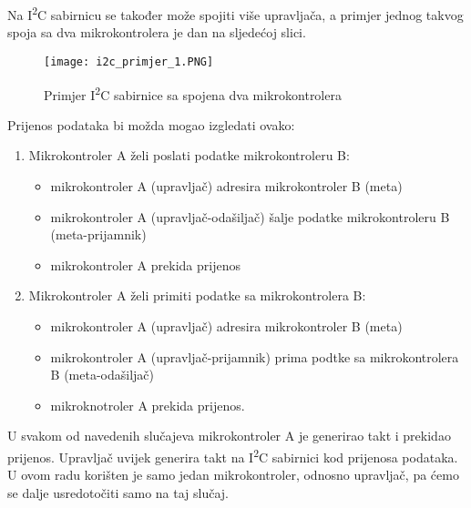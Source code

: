 Na I\textsuperscript{2}C sabirnicu se također može spojiti više upravljača, a
primjer jednog takvog spoja sa dva mikrokontrolera je dan na sljedećoj slici.
\begin{figure}[hp]
	\centering
	\texttt{[image: i2c\_primjer\_1.PNG]}
	\caption{Primjer I\textsuperscript{2}C sabirnice sa spojena dva
	mikrokontrolera}
	\label{fig:i2c_primjer_1}
\end{figure}
Prijenos podataka bi možda mogao izgledati ovako:
\begin{enumerate}
	\item Mikrokontroler A želi poslati podatke mikrokontroleru B:
	\begin{itemize}
		\item mikrokontroler A (upravljač) adresira mikrokontroler B (meta)
		\item mikrokontroler A (upravljač-odašiljač) šalje podatke
		mikrokontroleru B (meta-prijamnik)
		\item mikrokontroler A prekida prijenos
	\end{itemize}
	\item Mikrokontroler A želi primiti podatke sa mikrokontrolera B:
		\begin{itemize}
		\item mikrokontroler A (upravljač) adresira mikrokontroler B (meta)
		\item mikrokontroler A (upravljač-prijamnik) prima podtke sa
		mikrokontrolera B (meta-odašiljač)
		\item mikroknotroler A prekida prijenos.
	\end{itemize}
\end{enumerate}
U svakom od navedenih slučajeva mikrokontroler A je generirao takt i prekidao
prijenos. Upravljač uvijek generira takt na I\textsuperscript{2}C sabirnici kod
prijenosa podataka. U ovom radu korišten je samo jedan mikrokontroler, odnosno
upravljač, pa ćemo se dalje usredotočiti samo na taj slučaj.